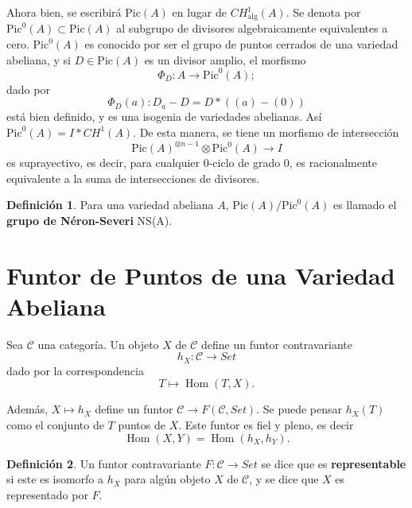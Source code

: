 \documentclass[10pt]{amsart}
\theoremstyle{definition}
\newtheorem{definition}{Definici\'on}[section]
\theoremstyle{remark}
\theoremstyle{definition}
\begin{document}
Ahora bien, se escribirá $\mathrm{Pic}(A)$ en lugar de $CH^{1}_{\mathrm{alg}}(A)$. Se denota por $\mathrm{Pic}^{0}(A) \subset \mathrm{Pic}(A)$ al subgrupo de divisores algebraicamente equivalentes a cero. $\mathrm{Pic}^{0}(A)$ es conocido por ser el grupo de puntos cerrados de una variedad abeliana, y si $D \in \mathrm{Pic}(A)$ es un divisor amplio, el morfismo
\begin{equation*}
\Phi_{D}:A \rightarrow \mathrm{Pic}^{0}(A);
\end{equation*}
dado por 
\begin{equation*}
\Phi_{D}(a):D_{a}-D=D*((a)-(0))
\end{equation*}
está bien definido, y es una isogenia de variedades abelianas. Así $\mathrm{Pic}^{0}(A)=I*CH^{1}(A)$. De esta manera, se tiene un morfismo de intersección
\begin{equation*}
\mathrm{Pic}(A)^{\otimes n-1} \otimes \mathrm{Pic}^{0}(A) \rightarrow I
\end{equation*}
es suprayectivo, es decir, para cualquier $0$-ciclo de grado $0$, es racionalmente equivalente a la suma de intersecciones de divisores.

\begin{definition} Para una variedad abeliana $A$, $\mathrm{Pic}(A)/\mathrm{Pic}^{0}(A)$ es llamado el \textbf{grupo de Néron-Severi} NS(A).
\end{definition}

\section{Funtor de Puntos de una Variedad Abeliana}
Sea $\mathcal{C}$ una categoría. Un objeto $X$ de $\mathcal{C}$ define un funtor contravariante
\begin{equation*}
h_{X}:\mathcal{C} \rightarrow Set
\end{equation*}
dado por la correspondencia
\begin{equation*}
T \mapsto \operatorname{Hom}(T,X).
\end{equation*}

Además, $X \mapsto h_{X}$ define un funtor $\mathcal{C} \rightarrow F(\mathcal{C},Set)$. Se puede pensar $h_{X}(T)$ como el conjunto de $T$ puntos de $X$. Este funtor es fiel y pleno, es decir 
\begin{equation*}
\operatorname{Hom}(X,Y)=\operatorname{Hom}(h_{X},h_{Y}).
\end{equation*}

\begin{definition} Un funtor contravariante $F:\mathcal{C} \rightarrow Set$ se dice que es \textbf{representable} si este es isomorfo a $h_{X}$ para algún objeto $X$ de $\mathcal{C}$, y se dice que $X$ es representado por $F$.
 \end{definition}
\end{document}
